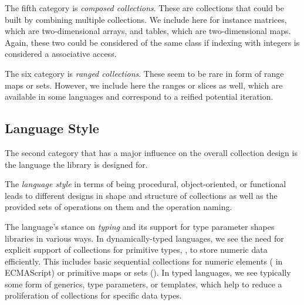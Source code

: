 \documentclass[sigconf, 10pt]{acmart}
\begin{document}
The fifth category is \emph{composed collections}.
These are collections that could be built by combining multiple collections.
We include here for instance matrices, which are two-dimensional arrays,
and tables, which are two-dimensional maps.
Again, these two could be considered of the same class
if indexing with integers is considered a associative access.

The six category is \emph{ranged collections}.
These seem to be rare in form of range maps or sets.
However, we include here the ranges or slices as well,
which are available in some languages
and correspond to a reified potential iteration.

\subsection{Language Style}
\label{sec:language-style}

The second category that has a major influence on the overall collection design
is the language the library is designed for.

The \emph{language style} in terms of being procedural, object-oriented,
or functional leads to different designs in shape and structure of collections
as well as the provided sets of operations on them and the operation naming.

The language's stance on \emph{typing} and its support for type parameter
shapes libraries in various ways.
In dynamically-typed languages,
we see the need for explicit support of collections for primitive types, \eg,
to store numeric data efficiently.
This includes basic sequential collections for numeric elements (\eg {} in ECMAScript)
or primitive maps or sets (\eg {}).
In typed languages,
we see typically some form of generics, type parameters, or templates,
which help to reduce a proliferation of collections for specific data types.
\end{document}
